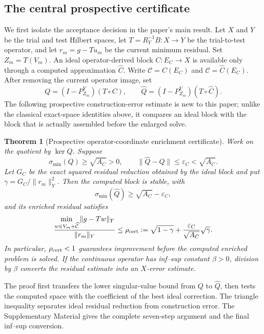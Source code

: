 \documentclass[11pt]{article}
\newtheorem{theorem}{Theorem}[section]
\numberwithin{algorithm}{section}
\theoremstyle{definition}\newtheorem{definition}[theorem]{Definition}
\theoremstyle{remark}\newtheorem{remark}[theorem]{Remark}
\begin{document}
\subsection{The central prospective certificate}
We first isolate the acceptance decision in the paper's main result.  Let $X$ and $Y$ be the trial and test
Hilbert spaces, let $T=R_Y^{-1}B:X\to Y$ be the trial-to-test operator, and let
$r_m=g-Tu_m$ be the current minimum residual. Set $Z_m=T(V_m)$. An ideal operator-derived block
$C:E_C\to X$ is available only through a computed approximation
$\widehat C$. Write $\mathcal C=C(E_C)$ and
$\widehat{\mathcal C}=\widehat C(E_C)$. After removing the current operator
image, set
\[
 Q=(I-P_{Z_m}^Y)(T\circ C),
 \qquad \widehat Q=(I-P_{Z_m}^Y)(T\circ\widehat C).
\]
The following prospective construction-error estimate is new to this paper;
unlike the classical exact-space identities above, it compares an ideal block
with the block that is actually assembled before the enlarged solve.

\begin{theorem}[Prospective operator-coordinate enrichment certificate]
\label{thm:prospective-certificate}
Work on the quotient by $\ker Q$.  Suppose
\[
 \sigma_{\min}(Q)\geq\sqrt{A_C}>0,
 \qquad
 \|\widehat Q-Q\|\leq\varepsilon_C<\sqrt{A_C}.
\]
Let $G_C$ be the exact squared residual reduction obtained by the ideal block
and put $\gamma=G_C/\|r_m\|_Y^2$.  Then the computed block is stable, with
\[
 \sigma_{\min}(\widehat Q)\geq\sqrt{A_C}-\varepsilon_C,
\]
and its enriched residual satisfies
\begin{equation}
 \frac{\displaystyle
 \min_{w\in V_m+\widehat{\mathcal C}}\|g-Tw\|_Y}
 {\|r_m\|_Y}
 \leq
 \rho_{\rm cert}:=
 \sqrt{1-\gamma}
 +\frac{\varepsilon_C}{\sqrt{A_C}}\sqrt{\gamma}.
 \label{eq:main-prospective-certificate}
\end{equation}
In particular, $\rho_{\rm cert}<1$ guarantees improvement before the computed
enriched problem is solved.  If the continuous operator has inf--sup constant
$\beta>0$, division by $\beta$ converts the residual estimate into an
$X$-error estimate.
\end{theorem}

The proof first transfers the lower singular-value bound from $Q$ to
$\widehat Q$, then tests the computed space with the coefficient of the best
ideal correction. The triangle inequality separates ideal residual reduction
from construction error.  The Supplementary Material gives the
complete seven-step argument and the final inf--sup conversion.
\end{document}
